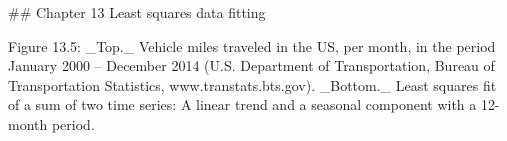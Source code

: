 

## Chapter 13 Least squares data fitting

Figure 13.5: _Top._ Vehicle miles traveled in the US, per month, in the period January 2000 – December 2014 (U.S. Department of Transportation, Bureau of Transportation Statistics, www.transtats.bts.gov). _Bottom._ Least squares fit of a sum of two time series: A linear trend and a seasonal component with a 12-month period.

